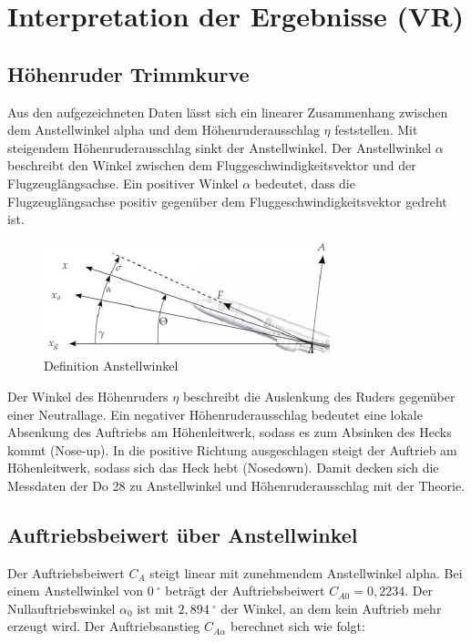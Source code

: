 \chapter{Interpretation der Ergebnisse (VR)}

\section{Höhenruder Trimmkurve}

Aus den aufgezeichneten Daten lässt sich ein linearer Zusammenhang zwischen dem Anstellwinkel alpha und dem 
Höhenruderausschlag $\eta$ feststellen. Mit steigendem Höhenruderausschlag sinkt der Anstellwinkel. 
Der Anstellwinkel $\alpha$ beschreibt den Winkel zwischen dem Fluggeschwindigkeitsvektor und der Flugzeuglängsachse. Ein positiver Winkel $\alpha$ bedeutet, dass die Flugzeuglängsachse positiv gegenüber dem Fluggeschwindigkeitsvektor gedreht ist. 

\begin{figure}[h]
		\includegraphics{./Bilder/Anstellwinkel_Definition.jpg}
	\caption{Definition Anstellwinkel}
	\label{alpha_def}
\end{figure}

Der Winkel des Höhenruders $\eta$ beschreibt die Auslenkung des Ruders gegenüber einer Neutrallage. Ein negativer 
Höhenruderausschlag bedeutet eine lokale Absenkung des Auftriebs am Höhenleitwerk, sodass es zum Absinken des Hecks kommt (Nose-up). In die positive Richtung ausgeschlagen steigt der Auftrieb am Höhenleitwerk, sodass sich das Heck hebt (Nosedown). 
Damit decken sich die Messdaten der Do 28 zu Anstellwinkel und Höhenruderausschlag mit der Theorie.




\section{Auftriebsbeiwert über Anstellwinkel}

Der Auftriebsbeiwert $C_A$ steigt linear mit zunehmendem Anstellwinkel alpha. Bei einem Anstellwinkel von $0 \ ^{\circ}$ beträgt der Auftriebsbeiwert $C_{A0}=0,2234$. Der Nullauftriebswinkel $\alpha_{0}$ ist mit $2,894 \ ^{\circ}$ der Winkel, an dem kein Auftrieb mehr erzeugt wird. Der Auftriebsanstieg $C_{A\alpha}$ berechnet sich wie folgt:

